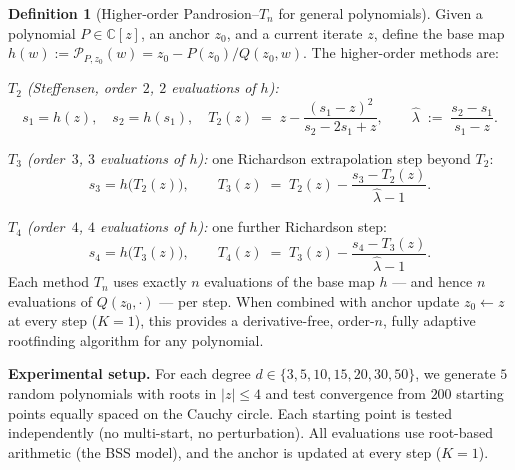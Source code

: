 \documentclass[10pt,a4paper,oneside]{book}
\theoremstyle{definition}
\newtheorem{definition}[theorem]{Definition}
\theoremstyle{remark}
\newcommand{\CC}{\mathbb{C}}
\begin{document}
\begin{definition}[Higher-order Pandrosion--$T_n$ for general polynomials]
\label{def:higher_order_universal}
Given a polynomial $P \in \CC[z]$, an anchor $z_0$, and a current iterate $z$, define the base map $h(w) := \mathcal{P}_{P,z_0}(w) = z_0 - P(z_0)/Q(z_0, w)$.  The higher-order methods are:

\medskip

\emph{$T_2$ (Steffensen, order~$2$, $2$ evaluations of $h$):}
\begin{equation}
  \label{eq:T2_universal}
  s_1 = h(z), \quad s_2 = h(s_1), \quad
  T_2(z) \;=\; z - \frac{(s_1 - z)^2}{s_2 - 2s_1 + z},
  \qquad
  \hat{\lambda} \;:=\; \frac{s_2 - s_1}{s_1 - z}.
\end{equation}

\emph{$T_3$ (order~$3$, $3$ evaluations of $h$):}  one Richardson extrapolation step beyond $T_2$:
\begin{equation}
  \label{eq:T3_universal}
  s_3 = h\bigl(T_2(z)\bigr), \qquad
  T_3(z) \;=\; T_2(z) - \frac{s_3 - T_2(z)}{\hat{\lambda} - 1}.
\end{equation}

\emph{$T_4$ (order~$4$, $4$ evaluations of $h$):}  one further Richardson step:
\begin{equation}
  \label{eq:T4_universal}
  s_4 = h\bigl(T_3(z)\bigr), \qquad
  T_4(z) \;=\; T_3(z) - \frac{s_4 - T_3(z)}{\hat{\lambda} - 1}.
\end{equation}
Each method $T_n$ uses exactly $n$ evaluations of the base map $h$ --- and hence $n$ evaluations of $Q(z_0, \cdot)$ --- per step.  When combined with anchor update $z_0 \leftarrow z$ at every step ($K = 1$), this provides a derivative-free, order-$n$, fully adaptive rootfinding algorithm for any polynomial.
\end{definition}

\medskip

\textbf{Experimental setup.}  For each degree $d \in \{3, 5, 10, 15, 20, 30, 50\}$, we generate $5$ random polynomials with roots in $|z| \leq 4$ and test convergence from $200$ starting points equally spaced on the Cauchy circle.  Each starting point is tested independently (no multi-start, no perturbation).  All evaluations use root-based arithmetic (the BSS model), and the anchor is updated at every step ($K = 1$).
\end{document}
